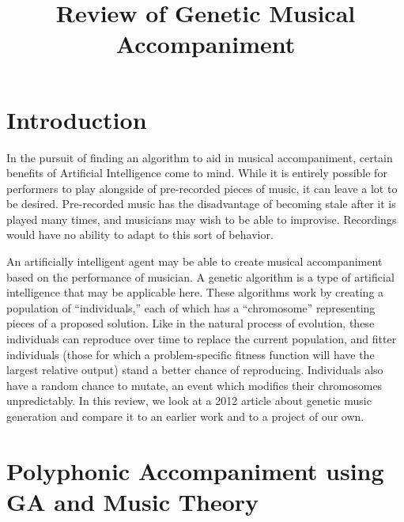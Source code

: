 \documentclass[conference]{IEEEtran}
\begin{document}
\title{Review of Genetic Musical Accompaniment
	\\
	{\footnotesize }
}
\author{
	\and
}

\maketitle

\section{Introduction}

In the pursuit of finding an algorithm to aid in musical accompaniment, certain benefits of Artificial Intelligence come to mind. While it is entirely possible for performers to play alongside of pre-recorded pieces of music, it can leave a lot to be desired. Pre-recorded music has the disadvantage of becoming stale after it is played many times, and musicians may wish to be able to improvise. Recordings would have no ability to adapt to this sort of behavior.

An artificially intelligent agent may be able to create musical accompaniment based on the performance of musician. A genetic algorithm is a type of artificial intelligence that may be applicable here. These algorithms work by creating a population of “individuals,” each of which has a “chromosome” representing pieces of a proposed solution. Like in the natural process of evolution, these individuals can reproduce over time to replace the current population, and fitter individuals (those for which a problem-specific fitness function will have the largest relative output) stand a better chance of reproducing. Individuals also have a random chance to mutate, an event which modifies their chromosomes unpredictably.  In this review, we look at a 2012 article about genetic music generation and compare it to an earlier work and to a project of our own.


\section{Polyphonic Accompaniment using GA and Music Theory}
\end{document}
